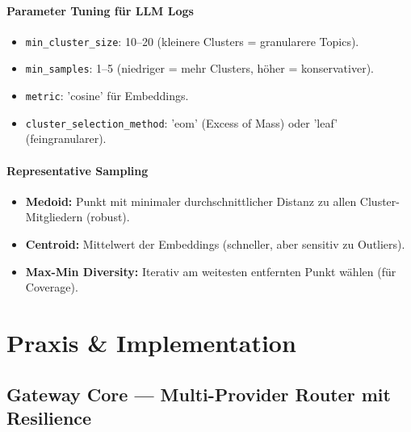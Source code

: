 \paragraph{Parameter Tuning für LLM Logs}
\begin{itemize}
    \item \texttt{min\_cluster\_size}: 10–20 (kleinere Clusters = granularere Topics).
    \item \texttt{min\_samples}: 1–5 (niedriger = mehr Clusters, höher = konservativer).
    \item \texttt{metric}: 'cosine' für Embeddings.
    \item \texttt{cluster\_selection\_method}: 'eom' (Excess of Mass) oder 'leaf' (feingranularer).
\end{itemize}

\paragraph{Representative Sampling}
\begin{itemize}
    \item \textbf{Medoid:} Punkt mit minimaler durchschnittlicher Distanz zu allen Cluster-Mitgliedern (robust).
    \item \textbf{Centroid:} Mittelwert der Embeddings (schneller, aber sensitiv zu Outliers).
    \item \textbf{Max-Min Diversity:} Iterativ am weitesten entfernten Punkt wählen (für Coverage).
\end{itemize}

\section{Praxis \& Implementation}

\subsection{Gateway Core — Multi-Provider Router mit Resilience}

